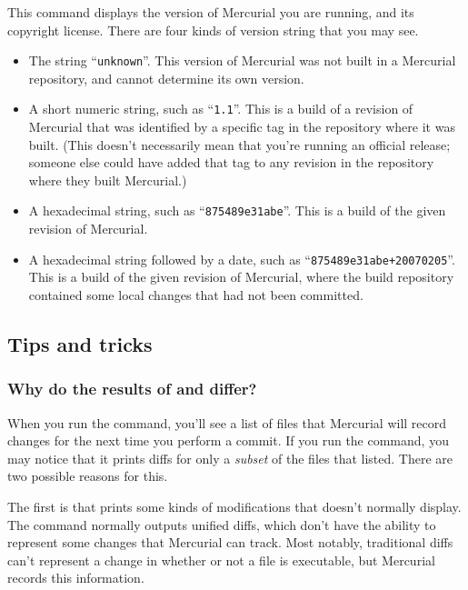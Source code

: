 This command displays the version of Mercurial you are running, and
its copyright license.  There are four kinds of version string that
you may see.
\begin{itemize}
\item The string ``\texttt{unknown}''. This version of Mercurial was
  not built in a Mercurial repository, and cannot determine its own
  version.
\item A short numeric string, such as ``\texttt{1.1}''. This is a
  build of a revision of Mercurial that was identified by a specific
  tag in the repository where it was built.  (This doesn't necessarily
  mean that you're running an official release; someone else could
  have added that tag to any revision in the repository where they
  built Mercurial.)
\item A hexadecimal string, such as ``\texttt{875489e31abe}''.  This
  is a build of the given revision of Mercurial.
\item A hexadecimal string followed by a date, such as
  ``\texttt{875489e31abe+20070205}''.  This is a build of the given
  revision of Mercurial, where the build repository contained some
  local changes that had not been committed.
\end{itemize}

\subsection{Tips and tricks}

\subsubsection{Why do the results of  and 
  differ?}
\label{cmdref:diff-vs-status}

When you run the  command, you'll see a list of files
that Mercurial will record changes for the next time you perform a
commit.  If you run the  command, you may notice that it
prints diffs for only a \emph{subset} of the files that 
listed.  There are two possible reasons for this.

The first is that  prints some kinds of modifications
that  doesn't normally display.  The  command
normally outputs unified diffs, which don't have the ability to
represent some changes that Mercurial can track.  Most notably,
traditional diffs can't represent a change in whether or not a file is
executable, but Mercurial records this information.

